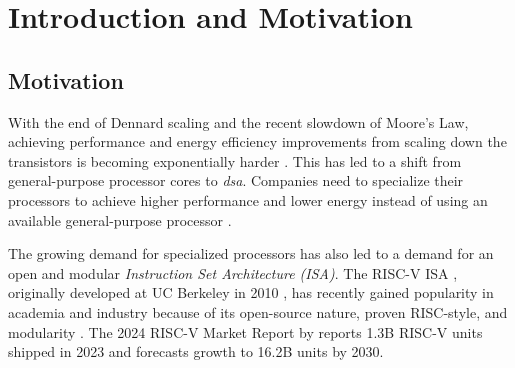 
\chapter{Introduction and Motivation}
\label{Introduction} 





\section{Motivation}


With the end of Dennard scaling and the recent slowdown of Moore's Law, achieving performance and energy efficiency improvements from scaling down the transistors is becoming exponentially harder \cite{hennessyComputerArchitectureQuantitative2019}. This has led to a shift from general-purpose processor cores to \textit{\acrfull{dsa}}. Companies need to specialize their processors to achieve higher performance and lower energy instead of using an available general-purpose processor \cite{mezgerSurveyRISCVArchitecture2022}. 


The growing demand for specialized processors has also led to a demand for an open and modular \textit{Instruction Set Architecture (ISA)}. The RISC-V ISA \cite{watermanRISCVInstructionSet2019,watermanRISCVInstructionSet2021}, originally developed at UC Berkeley in 2010 \cite{pattersonComputerOrganizationDesign2021}, has recently gained popularity in academia and industry because of its open-source nature, proven RISC-style, and modularity \cite{theshdgroupRISCVMarketReport2024, asanovicInstructionSetsShould2014}.
The 2024 RISC-V Market Report by \textcite{theshdgroupRISCVMarketReport2024} reports 1.3B RISC-V units shipped in 2023 and forecasts growth to 16.2B units by 2030.



